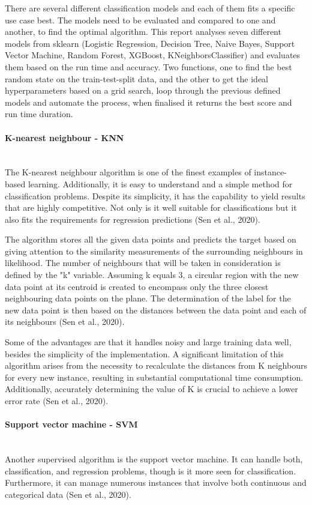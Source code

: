\documentclass{article}
\begin{document}
\begin{multicols}{2}
There are several different classification models and each of them fits a specific use case best. 
The models need to be evaluated and compared to one and another, to find the optimal algorithm. This report analyses seven different models from sklearn (Logistic Regression, Decision Tree, Naive Bayes, Support Vector Machine, Random Forest, XGBoost, KNeighborsClassifier) and evaluates them based on the run time and accuracy. 
Two functions, one to find the best random state on the train-test-split data, and the other to get the ideal hyperparameters based on a grid search, loop through the previous defined models and automate the process, when finalised it returns the best score and run time duration.

\paragraph*{\textbf{K-nearest neighbour - KNN}}\mbox{}\\
The K-nearest neighbour algorithm is one of the finest examples of instance-based learning. Additionally, it is easy to understand and a simple method for classification problems. Despite its simplicity, it has the capability to yield results that are highly competitive. Not only is it well suitable for classifications but it also fits the requirements for regression predictions (Sen et al., 2020).

The algorithm stores all the given data points and predicts the target based on giving attention to the similarity measurements of the surrounding neighbours in likelihood. The number of neighbours that will be taken in consideration is defined by the "k" variable. Assuming k equals 3, a circular region with the new data point at its centroid is created to encompass only the three closest neighbouring data points on the plane. The determination of the label for the new data point is then based on the distances between the data point and each of its neighbours (Sen et al., 2020).

Some of the advantages are that it handles noisy and large training data well, besides the simplicity of the implementation. A significant limitation of this algorithm arises from the necessity to recalculate the distances from K neighbours for every new instance, resulting in substantial computational time consumption. Additionally, accurately determining the value of K is crucial to achieve a lower error rate (Sen et al., 2020).

\paragraph*{\textbf{Support vector machine - SVM}}\mbox{}\\
Another supervised algorithm is the support vector machine. It can handle both, classification, and regression problems, though is it more seen for classification. Furthermore, it can manage numerous instances that involve both continuous and categorical data (Sen et al., 2020).


\end{multicols}
\end{document}
